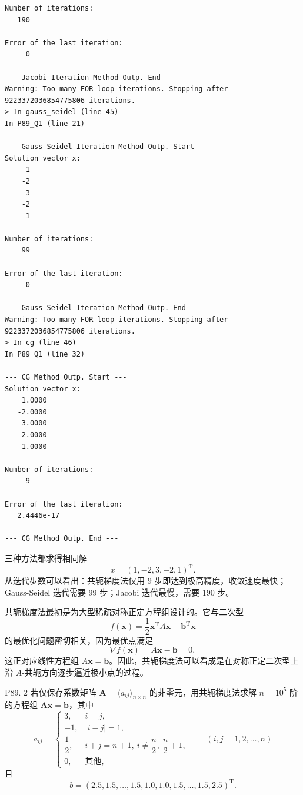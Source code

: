 \documentclass[11pt, a4paper]{ctexart}
\begin{document}
\begin{solution}
\begin{lstlisting}
Number of iterations:
   190

Error of the last iteration:
     0

--- Jacobi Iteration Method Outp. End ---
Warning: Too many FOR loop iterations. Stopping after 9223372036854775806 iterations.
> In gauss_seidel (line 45)
In P89_Q1 (line 21)

--- Gauss-Seidel Iteration Method Outp. Start ---
Solution vector x:
     1
    -2
     3
    -2
     1

Number of iterations:
    99

Error of the last iteration:
     0

--- Gauss-Seidel Iteration Method Outp. End ---
Warning: Too many FOR loop iterations. Stopping after 9223372036854775806 iterations.
> In cg (line 46)
In P89_Q1 (line 32)

--- CG Method Outp. Start ---
Solution vector x:
    1.0000
   -2.0000
    3.0000
   -2.0000
    1.0000

Number of iterations:
     9

Error of the last iteration:
   2.4446e-17

--- CG Method Outp. End ---
\end{lstlisting}

    三种方法都求得相同解
    \[
        x = (1,-2,3,-2,1)^{\mathrm{T}}.
    \]
    从迭代步数可以看出：共轭梯度法仅用 9 步即达到极高精度，收敛速度最快；Gauss-Seidel 迭代需要 99 步；Jacobi 迭代最慢，需要 190 步。

    共轭梯度法最初是为大型稀疏对称正定方程组设计的。它与二次型
    \[
        f(\mathbf{x}) = \frac{1}{2}\mathbf{x}^{\mathrm{T}}A\mathbf{x} - \mathbf{b}^{\mathrm{T}}\mathbf{x}
    \]
    的最优化问题密切相关，因为最优点满足
    \[
        \nabla f(\mathbf{x}) = A\mathbf{x} - \mathbf{b} = 0,
    \]
    这正对应线性方程组 $A\mathbf{x} = \mathbf{b}$。因此，共轭梯度法可以看成是在对称正定二次型上沿 $A$-共轭方向逐步逼近极小点的过程。
\end{solution}


\begin{problem}{P89. 2}
    若仅保存系数矩阵 $\boldsymbol{A}=\langle a_{ij} \rangle_{n \times n}$ 的非零元，用共轭梯度法求解 $n=10^5$ 阶的方程组 $\mathbf{A}\mathbf{x}=\mathbf{b}$，其中
    \[
        a_{ij} =
        \begin{cases}
            3, & i=j, \\
            -1, & |i-j|=1, \\
            \dfrac{1}{2}, & i+j=n+1,\ i \ne \dfrac{n}{2},\ \dfrac{n}{2}+1, \\
            0, & \text{其他},
        \end{cases}
        \qquad (i,j=1,2,\dots,n)
    \]
    且
    \[
        b = (2.5,1.5,\dots,1.5,1.0,1.0,1.5,\dots,1.5,2.5)^{\mathrm{T}}.
    \]
\end{problem}
\end{document}
